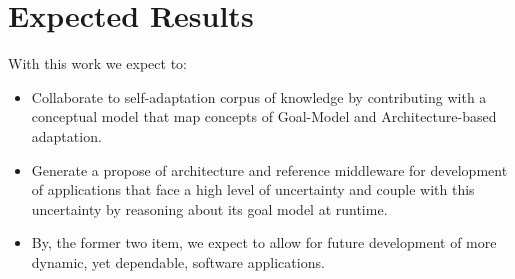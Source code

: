 \section{Expected Results}

With this work we expect to:

\begin{itemize}
\item Collaborate to self-adaptation corpus of knowledge by contributing with a conceptual model that map concepts of Goal-Model and Architecture-based adaptation.

\item Generate a propose of architecture and reference middleware for development of applications that face a high level of uncertainty and couple with this uncertainty by reasoning about its goal model at runtime.

\item By, the former two item, we expect to allow for future development of more dynamic, yet dependable, software applications.

\end{itemize}
